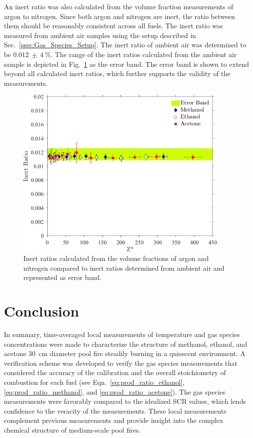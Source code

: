 \documentclass[12pt]{article}
\begin{document}
An inert ratio was also calculated from the volume fraction measurements of argon to nitrogen. Since both argon and nitrogen are inert, the ratio between them should be reasonably consistent across all fuels. The inert ratio was measured from ambient air samples using the setup described in Sec.~\ref{ssec:Gas_Species_Setup}. The inert ratio of ambient air was determined to be $0.012~\pm~4~\%$. The range of the inert ratios calculated from the ambient air sample is depicted in Fig.~\ref{fig:IR} as the error band. The error band is shown to extend beyond all calculated inert ratios, which further supports the validity of the measurements. 
\begin{figure}[h!]
	\centering
\includegraphics[width=10.5cm, keepaspectratio]{Inert_ratio_Comparison.png}
	\caption[Stoichiometric Combustion Ratio calculated from experimental values compared to theoretical values]{Inert ratios calculated from the volume fractions of argon and nitrogen compared to inert ratios determined from ambient air and represented as error band.}
	\label{fig:IR}
\end{figure}


\section{Conclusion}
\label{sec:Conclusion}
In summary, time-averaged local measurements of temperature and gas species concentrations were made to characterize the structure of methanol, ethanol, and acetone \SI{30}{cm} diameter pool fire steadily burning in a quiescent environment. A verification scheme was developed to verify the gas species measurements that considered  the accuracy of the calibration and the overall stoichiometry of combustion for each fuel (see Eqn.~\ref{eq:prod_ratio_ethanol}, \ref{eq:prod_ratio_methanol}, and \ref{eq:prod_ratio_acetone}). The gas species measurements were favorably compared to the idealized SCR values, which lends confidence to the veracity of the measurements. These local measurements complement previous measurements and provide insight into the complex chemical structure of medium-scale pool fires.
\end{document}
